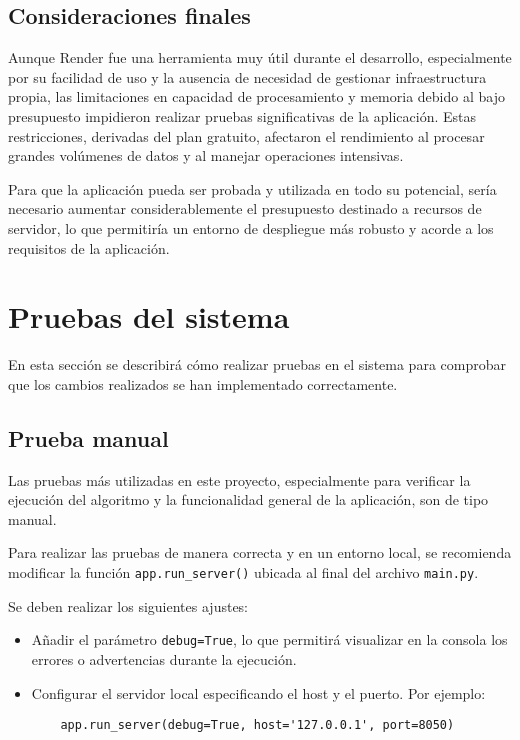 \subsection{Consideraciones finales}

Aunque Render fue una herramienta muy útil durante el desarrollo, especialmente por su facilidad de uso y la ausencia de necesidad de gestionar infraestructura propia, las limitaciones en capacidad de procesamiento y memoria debido al bajo presupuesto impidieron realizar pruebas significativas de la aplicación. Estas restricciones, derivadas del plan gratuito, afectaron el rendimiento al procesar grandes volúmenes de datos y al manejar operaciones intensivas.  

Para que la aplicación pueda ser probada y utilizada en todo su potencial, sería necesario aumentar considerablemente el presupuesto destinado a recursos de servidor, lo que permitiría un entorno de despliegue más robusto y acorde a los requisitos de la aplicación.

\section{Pruebas del sistema}

En esta sección se describirá cómo realizar pruebas en el sistema para comprobar que los cambios realizados se han implementado correctamente.

\subsection{Prueba manual}

Las pruebas más utilizadas en este proyecto, especialmente para verificar la ejecución del algoritmo y la funcionalidad general de la aplicación, son de tipo manual.

Para realizar las pruebas de manera correcta y en un entorno local, se recomienda modificar la función \texttt{app.run\_server()} ubicada al final del archivo \texttt{main.py}. 

Se deben realizar los siguientes ajustes:
\begin{itemize}
    \item Añadir el parámetro \texttt{debug=True}, lo que permitirá visualizar en la consola los errores o advertencias durante la ejecución.
    \item Configurar el servidor local especificando el host y el puerto. Por ejemplo:
    \begin{verbatim}
    app.run_server(debug=True, host='127.0.0.1', port=8050)
    \end{verbatim}
\end{itemize}

